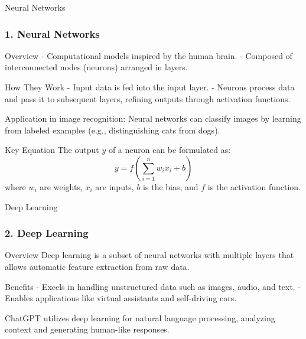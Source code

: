 \documentclass[aspectratio=169]{beamer}
\begin{document}
\begin{frame}[fragile]{Neural Networks}
    \frametitle{1. Neural Networks}
    
    \begin{block}{Overview}
        - Computational models inspired by the human brain.
        - Composed of interconnected nodes (neurons) arranged in layers.
    \end{block}
    
    \begin{block}{How They Work}
        - Input data is fed into the input layer.
        - Neurons process data and pass it to subsequent layers, refining outputs through activation functions.
    \end{block}
    
    \begin{example}
        Application in image recognition: Neural networks can classify images by learning from labeled examples (e.g., distinguishing cats from dogs).
    \end{example}
    
    \begin{block}{Key Equation}
        The output \( y \) of a neuron can be formulated as:
        \begin{equation}
            y = f\left(\sum_{i=1}^{n} w_i x_i + b\right)
        \end{equation}
        where \( w_i \) are weights, \( x_i \) are inputs, \( b \) is the bias, and \( f \) is the activation function.
    \end{block}
\end{frame}

\begin{frame}[fragile]{Deep Learning}
    \frametitle{2. Deep Learning}
    
    \begin{block}{Overview}
        Deep learning is a subset of neural networks with multiple layers that allows automatic feature extraction from raw data.
    \end{block}
    
    \begin{block}{Benefits}
        - Excels in handling unstructured data such as images, audio, and text.
        - Enables applications like virtual assistants and self-driving cars.
    \end{block}
    
    \begin{example}
        ChatGPT utilizes deep learning for natural language processing, analyzing context and generating human-like responses.
    \end{example}
\end{frame}
\end{document}
